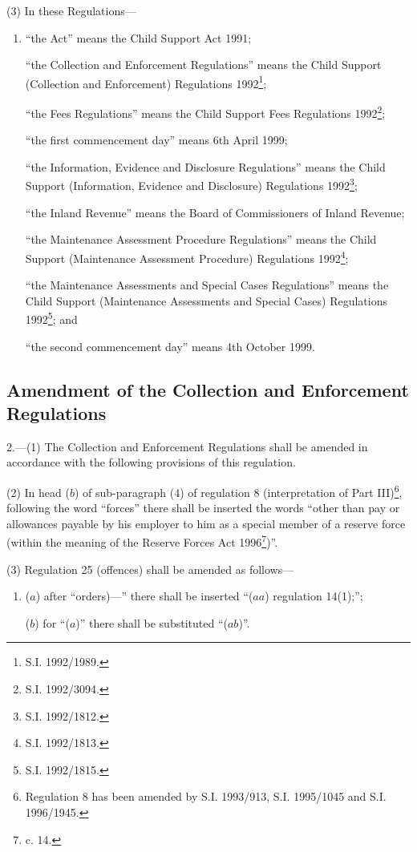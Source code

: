 \documentclass[12pt,a4paper]{article}
\begin{document}
(3) In these Regulations—
\begin{enumerate}\item[]
“the Act” means the Child Support Act 1991;

“the Collection and Enforcement Regulations” means the Child Support (Collection and Enforcement) Regulations 1992\footnote{\frenchspacing S.I. 1992/1989.};

“the Fees Regulations” means the Child Support Fees Regulations 1992\footnote{\frenchspacing S.I. 1992/3094.};

“the first commencement day” means 6th April 1999;

“the Information, Evidence and Disclosure Regulations” means the Child Support (Information, Evidence and Disclosure) Regulations 1992\footnote{\frenchspacing S.I. 1992/1812.};

“the Inland Revenue” means the Board of Commissioners of Inland Revenue;

“the Maintenance Assessment Procedure Regulations” means the Child Support (Maintenance Assessment Procedure) Regulations 1992\footnote{\frenchspacing S.I. 1992/1813.};

“the Maintenance Assessments and Special Cases Regulations” means the Child Support (Maintenance Assessments and Special Cases) Regulations 1992\footnote{\frenchspacing S.I. 1992/1815.}; and

“the second commencement day” means 4th October 1999.
\end{enumerate}

\subsection[2. Amendment of the Collection and Enforcement Regulations]{\sloppy Amendment of the Collection and Enforcement Regulations}

2.—(1) The Collection and Enforcement Regulations shall be amended in accordance with the following provisions of this regulation.

(2) In head ($b$) of sub-paragraph (4) of regulation 8 (interpretation of Part III)\footnote{\frenchspacing Regulation 8 has been amended by S.I. 1993/913, S.I. 1995/1045 and S.I. 1996/1945.}, following the word “forces” there shall be inserted the words “other than pay or allowances payable by his employer to him as a special member of a reserve force (within the meaning of the Reserve Forces Act 1996\footnote{ c. 14.})”.

(3) Regulation 25 (offences) shall be amended as follows—
\begin{enumerate}\item[]
($a$) after “orders)—” there shall be inserted “($aa$) regulation 14(1);”;

($b$) for “($a$)” there shall be substituted “($ab$)”.
\end{enumerate}
\end{document}
